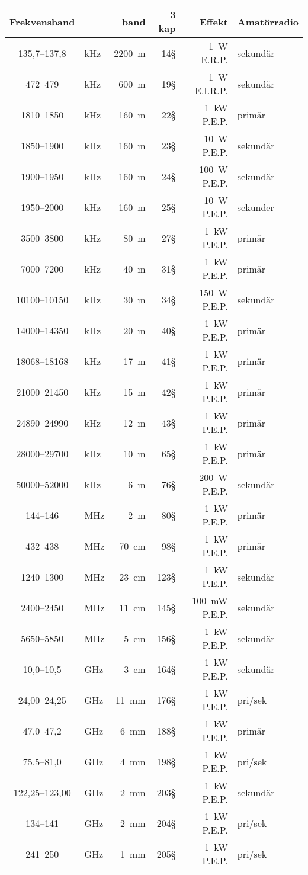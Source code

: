 \begin{tabular}{clr|rr|l}
Frekvensband    &     & band   & 3 kap & Effekt       & Amatörradio \\ \hline
  135,7--137,8 & kHz & 2200~m &  14\S  & 1~W E.R.P.  & sekundär \\
    472--479 & kHz & 600~m  &  19\S  & 1~W E.I.R.P. & sekundär \\
   1810--1850 & kHz & 160~m  &  22\S & 1~kW P.E.P.  & primär \\
   1850--1900 & kHz & 160~m  &  23\S  & 10~W P.E.P.  & sekundär \\
   1900--1950 & kHz & 160~m  &  24\S  & 100~W P.E.P. & sekundär \\
   1950--2000 & kHz & 160~m  &  25\S  & 10~W P.E.P.  & sekunder \\
   3500--3800 & kHz &  80~m  &  27\S  & 1~kW P.E.P.  & primär \\
   7000--7200 & kHz &  40~m  &  31\S  & 1~kW P.E.P.  & primär \\
  10100--10150 & kHz &  30~m  &  34\S  & 150~W P.E.P. & sekundär \\
  14000--14350 & kHz &  20~m  &  40\S  & 1~kW P.E.P.  & primär \\
  18068--18168 & kHz &  17~m  &  41\S  & 1~kW P.E.P.  & primär \\
  21000--21450 & kHz &  15~m  &  42\S  & 1~kW P.E.P.  & primär \\
  24890--24990 & kHz &  12~m  &  43\S & 1~kW P.E.P.  & primär \\
  28000--29700 & kHz &  10~m  &  65\S  & 1~kW P.E.P.  & primär \\
  50000--52000 & kHz &   6~m  &  76\S  & 200~W P.E.P. & sekundär \\ \hline
    144--146 & MHz &   2~m  &  80\S  & 1~kW P.E.P.  & primär \\
    432--438 & MHz &  70~cm &  98\S  & 1~kW P.E.P.  & primär \\
   1240--1300 & MHz &  23~cm & 123\S  & 1~kW P.E.P.  & sekundär \\
   2400--2450 & MHz &  11~cm & 145\S  & 100~mW P.E.P. & sekundär \\
   5650--5850 & MHz &   5~cm & 156\S  & 1~kW P.E.P.  & sekundär \\
   10,0--10,5 & GHz &   3~cm & 164\S & 1~kW P.E.P.  & sekundär \\
  24,00--24,25 & GHz &  11~mm & 176\S  & 1~kW P.E.P.  & pri/sek \\
   47,0--47,2  & GHz &   6~mm & 188\S  & 1~kW P.E.P.  & primär \\
   75,5--81,0  & GHz &   4~mm & 198\S  & 1~kW P.E.P.  & pri/sek \\
 122,25--123,00   & GHz &   2~mm & 203\S  & 1~kW P.E.P.  & sekundär \\
    134--141   & GHz &   2~mm & 204\S  & 1~kW P.E.P.  & pri/sek \\
    241--250   & GHz &   1~mm & 205\S  & 1~kW P.E.P.  & pri/sek \\
\end{tabular}


